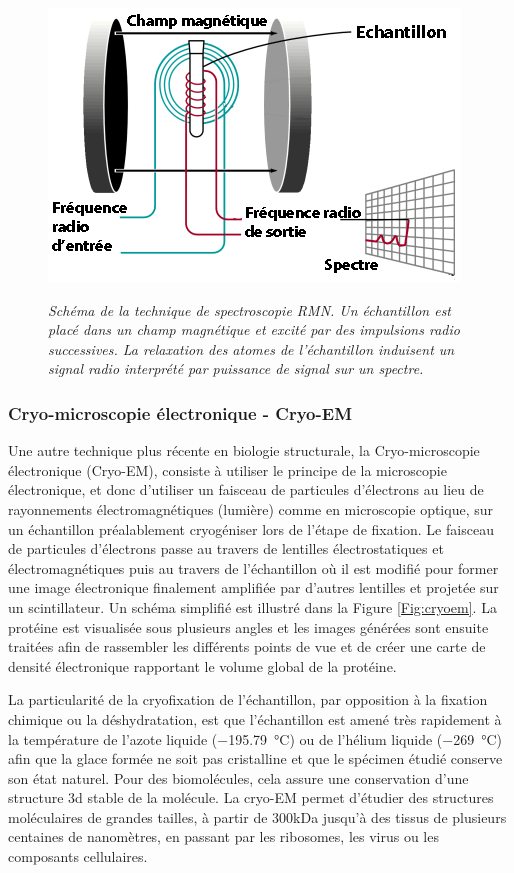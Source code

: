 \begin{figure}[h]
  \centering
  {\includegraphics[width=0.7\linewidth]{./figures/ch1/rmn.png}}
    \caption{\it Schéma de la technique de spectroscopie RMN. Un échantillon est placé dans un champ magnétique et excité par des impulsions radio successives. La relaxation des atomes de l'échantillon induisent un signal radio interprété par puissance de signal sur un spectre.}
    \label{Fig:rmn}
  \hspace{0.2cm}
\end{figure}

\subsubsection{Cryo-microscopie électronique - Cryo-EM}


Une autre technique plus récente en biologie structurale, la Cryo-microscopie électronique (Cryo-EM), consiste à utiliser le principe de la microscopie électronique, et donc d'utiliser un faisceau de particules d'électrons au lieu de rayonnements électromagnétiques (lumière) comme en microscopie optique, sur un échantillon préalablement cryogéniser lors de l'étape de fixation. Le faisceau de particules d'électrons passe au travers de lentilles électrostatiques et électromagnétiques puis au travers de l'échantillon où il est modifié pour former une image électronique finalement amplifiée par d'autres lentilles et projetée sur un scintillateur. Un schéma simplifié est illustré dans la Figure \ref{Fig:cryoem}.
La protéine est visualisée sous plusieurs angles et les images générées sont ensuite traitées afin de rassembler les différents points de vue et de créer une carte de densité électronique rapportant le volume global de la protéine.

La particularité de la cryofixation de l'échantillon, par opposition à la fixation chimique ou la déshydratation, est que l'échantillon est amené très rapidement à la température de l'azote liquide (\SI{-195.79}{\degreeCelsius}) ou de l'hélium liquide (\SI{-269}{\degreeCelsius}) afin que la glace formée ne soit pas cristalline et que le spécimen étudié conserve son état naturel. Pour des biomolécules, cela assure une conservation d'une structure 3d stable de la molécule. La cryo-EM permet d'étudier des structures moléculaires de grandes tailles, à partir de 300kDa jusqu'à des tissus de plusieurs centaines de nanomètres, en passant par les ribosomes, les virus ou les composants cellulaires.

